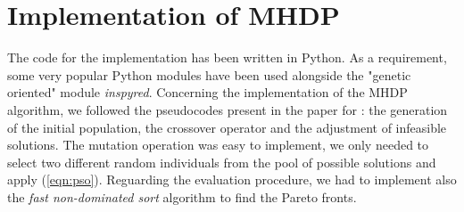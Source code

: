 \section{Implementation of MHDP}
The code for the implementation has been written in Python. As a requirement, some very popular Python modules have been used alongside the "genetic oriented" module \textit{inspyred}.
Concerning the implementation of the MHDP algorithm, we followed the pseudocodes present in the paper for : the generation of the initial population, the crossover operator
and the adjustment of infeasible solutions.
The mutation operation was easy to implement, we only needed to select two different random individuals from the pool of possible solutions and apply (\ref{eqn:pso}).
Reguarding the evaluation procedure, we had to implement also the 
\textit{fast non-dominated sort} algorithm to find the Pareto fronts.
